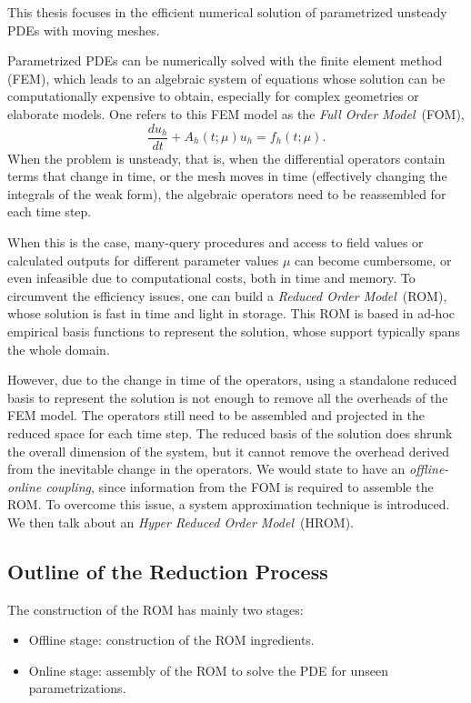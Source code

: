 This thesis focuses in the efficient numerical solution of parametrized unsteady PDEs with moving meshes.

Parametrized PDEs can be numerically solved with the finite element method (FEM), 
which leads to an algebraic system of equations whose solution 
can be computationally expensive to obtain, 
especially for complex geometries or elaborate models.
One refers to this FEM model as the \textit{Full Order Model}~(FOM),
\begin{equation}
   \frac{du_h}{dt} + A_h\left(t;\mu\right) u_h = f_h\left(t;\mu\right).
\end{equation}
When the problem is unsteady, that is, 
when the differential operators contain terms that change in time,
or the mesh moves in time (effectively changing the integrals of the weak form),
the algebraic operators need to be reassembled for each time step.

When this is the case, many-query procedures and access to field values or 
calculated outputs for different parameter values $\mu$ can become cumbersome, 
or even infeasible due to computational costs, both in time and memory.
To circumvent the efficiency issues, one can build a \textit{Reduced Order Model}~(ROM), 
whose solution is fast in time and light in storage.
This ROM is based in ad-hoc empirical basis functions to represent the solution, 
whose support typically spans the whole domain. 

However, due to the change in time of the operators, 
using a standalone reduced basis to represent the solution
is not enough to remove all the overheads of the FEM model.
The operators still need to be assembled 
and projected in the reduced space for each time step.
The reduced basis of the solution does shrunk the overall dimension of the system,
but it cannot remove the overhead derived from the inevitable change in the operators.
We would state to have an \textit{offline-online coupling},
since information from the FOM is required to assemble the ROM.
To overcome this issue, a system approximation technique is introduced.
We then talk about an \textit{Hyper Reduced Order Model}~(HROM).

\subsection{Outline of the Reduction Process}
The construction of the ROM has mainly two stages:
\begin{itemize}
   \item Offline stage: construction of the ROM ingredients.
   \item Online stage: assembly of the ROM to solve the PDE for unseen parametrizations.
\end{itemize}

